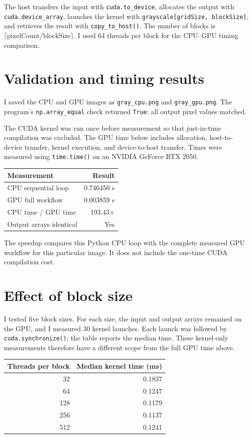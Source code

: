 \documentclass[12pt,a4paper]{article}
\begin{document}
The host transfers the input with \texttt{cuda.to\_device}, allocates the output with \texttt{cuda.device\_array}, launches the kernel with \texttt{grayscale[gridSize, blockSize]}, and retrieves the result with \texttt{copy\_to\_host()}. The number of blocks is \(\lceil\text{pixelCount}/\text{blockSize}\rceil\). I used 64 threads per block for the CPU--GPU timing comparison.

\section{Validation and timing results}
I saved the CPU and GPU images as \texttt{gray\_cpu.png} and \texttt{gray\_gpu.png}. The program's \texttt{np.array\_equal} check returned \texttt{True}: all output pixel values matched.

The CUDA kernel was run once before measurement so that just-in-time compilation was excluded. The GPU time below includes allocation, host-to-device transfer, kernel execution, and device-to-host transfer. Times were measured using \texttt{time.time()} on an NVIDIA GeForce RTX 2050.

\begin{center}
\begin{tabular}{lr}
\hline
Measurement & Result \\
\hline
CPU sequential loop & 0.746450 s \\
GPU full workflow & 0.003859 s \\
CPU time / GPU time & 193.43$\times$ \\
Output arrays identical & Yes \\
\hline
\end{tabular}
\end{center}

The speedup compares this Python CPU loop with the complete measured GPU workflow for this particular image. It does not include the one-time CUDA compilation cost.

\section{Effect of block size}
I tested five block sizes. For each size, the input and output arrays remained on the GPU, and I measured 30 kernel launches. Each launch was followed by \texttt{cuda.synchronize()}; the table reports the median time. These kernel-only measurements therefore have a different scope from the full GPU time above.

\begin{center}
\begin{tabular}{rr}
\hline
Threads per block & Median kernel time (ms) \\
\hline
32  & 0.1837 \\
64  & 0.1247 \\
128 & 0.1179 \\
256 & 0.1137 \\
512 & 0.1241 \\
\hline
\end{tabular}
\end{center}
\end{document}
